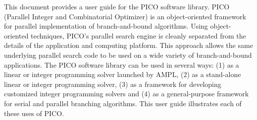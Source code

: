 This document provides a user guide for the PICO software library.
PICO (Parallel Integer and Combinatorial Optimizer) is an object-oriented
framework for parallel implementation of branch-and-bound algorithms.
Using object-oriented techniques, PICO's parallel search engine is cleanly
separated from the details of the application and computing platform. This
approach allows the same underlying parallel search code to be used on
a wide variety of branch-and-bound applications.  The PICO software library
can be used in several ways: (1) as a linear or integer programming
solver launched by AMPL, (2) as a stand-alone linear or integer programming
solver, (3) as a framework for developing customized integer programming
solvers and (4) as a general-purpose framework for serial and parallel
branching algorithms.  This user guide illustrates each of these uses
of PICO.

